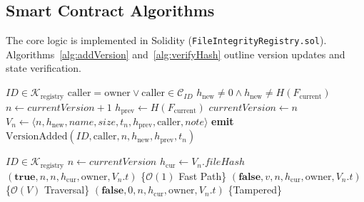 \documentclass[10pt,conference,letterpaper]{IEEEtran}
\begin{document}
\subsection{Smart Contract Algorithms}
The core logic is implemented in Solidity (\texttt{FileIntegrityRegistry.sol}). Algorithms~\ref{alg:addVersion} and~\ref{alg:verifyHash} outline version updates and state verification.

\begin{algorithm}[htbp]
\caption{Authorized Version Registration (\texttt{addVersion})}
\label{alg:addVersion}
\begin{algorithmic}[1]
\REQUIRE $\mathit{ID} \in \mathcal{K}_{\mathrm{registry}}$
\REQUIRE $\mathrm{caller} = \mathrm{owner} \lor \mathrm{caller} \in \mathcal{C}_{\mathit{ID}}$
\REQUIRE $h_{\mathrm{new}} \neq 0 \land h_{\mathrm{new}} \neq H(F_{\mathrm{current}})$
\STATE $n \leftarrow \mathit{currentVersion} + 1$
\STATE $h_{\mathrm{prev}} \leftarrow H(F_{\mathrm{current}})$
\STATE $\mathit{currentVersion} \leftarrow n$
\STATE $V_n \leftarrow \langle n, h_{\mathrm{new}}, \mathit{name}, \mathit{size}, t_n, h_{\mathrm{prev}}, \mathrm{caller}, \mathit{note} \rangle$
\STATE \textbf{emit} $\text{VersionAdded}(\mathit{ID}, \mathrm{caller}, n, h_{\mathrm{new}}, h_{\mathrm{prev}}, t_n)$
\end{algorithmic}
\end{algorithm}

\begin{algorithm}[htbp]
\caption{Two-Phase State Verification (\texttt{verifyHash})}
\label{alg:verifyHash}
\begin{algorithmic}[1]
\REQUIRE $\mathit{ID} \in \mathcal{K}_{\mathrm{registry}}$
\STATE $n \leftarrow \mathit{currentVersion}$
\STATE $h_{\mathrm{cur}} \leftarrow V_n.\mathit{fileHash}$
    \RETURN $(\mathbf{true}, n, n, h_{\mathrm{cur}}, \mathrm{owner}, V_n.t)$ \hfill \{$\mathcal{O}(1)$ Fast Path\}
\ENDIF
{}
        \RETURN $(\mathbf{false}, v, n, h_{\mathrm{cur}}, \mathrm{owner}, V_n.t)$ \hfill \{$\mathcal{O}(V)$ Traversal\}
    \ENDIF
\ENDFOR
\RETURN $(\mathbf{false}, 0, n, h_{\mathrm{cur}}, \mathrm{owner}, V_n.t)$ \hfill \{Tampered\}
\end{algorithmic}
\end{algorithm}

\end{document}
